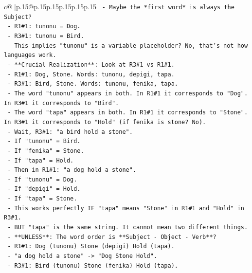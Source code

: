 \documentclass{article}
\begin{document}
{\begin{supertabular}{c@{$\;$}|p{.15\linewidth}@{}p{.15\linewidth}p{.15\linewidth}p{.15\linewidth}p{.15\linewidth}p{.15\linewidth}}
{{{\texttt{        {-} Maybe the *first word* is always the Subject?} \\
\texttt{          {-} R1\#1: tunonu = Dog.} \\
\texttt{          {-} R3\#1: tunonu = Bird.} \\
\texttt{          {-} This implies "tunonu" is a variable placeholder? No, that's not how languages work.} \\
\texttt{        {-} **Crucial Realization**: Look at R3\#1 vs R1\#1.} \\
\texttt{          {-} R1\#1: Dog, Stone. Words: tunonu, depigi, tapa.} \\
\texttt{          {-} R3\#1: Bird, Stone. Words: tunonu, fenika, tapa.} \\
\texttt{          {-} The word "tunonu" appears in both. In R1\#1 it corresponds to "Dog". In R3\#1 it corresponds to "Bird".} \\
\texttt{          {-} The word "tapa" appears in both. In R1\#1 it corresponds to "Stone". In R3\#1 it corresponds to "Hold" (if fenika is stone? No).} \\
\texttt{          {-} Wait, R3\#1: "a bird hold a stone".} \\
\texttt{            {-} If "tunonu" = Bird.} \\
\texttt{            {-} If "fenika" = Stone.} \\
\texttt{            {-} If "tapa" = Hold.} \\
\texttt{            {-} Then in R1\#1: "a dog hold a stone".} \\
\texttt{              {-} If "tunonu" = Dog.} \\
\texttt{              {-} If "depigi" = Hold.} \\
\texttt{              {-} If "tapa" = Stone.} \\
\texttt{              {-} This works perfectly IF "tapa" means "Stone" in R1\#1 and "Hold" in R3\#1.} \\
\texttt{              {-} BUT "tapa" is the same string. It cannot mean two different things.} \\
\texttt{              {-} **UNLESS**: The word order is **Subject {-} Object {-} Verb**?} \\
\texttt{                {-} R1\#1: Dog (tunonu) Stone (depigi) Hold (tapa).} \\
\texttt{                  {-} "a dog hold a stone" {-}> "Dog Stone Hold".} \\
\texttt{                {-} R3\#1: Bird (tunonu) Stone (fenika) Hold (tapa).} \\
}}}
\end{supertabular}}
\end{document}

